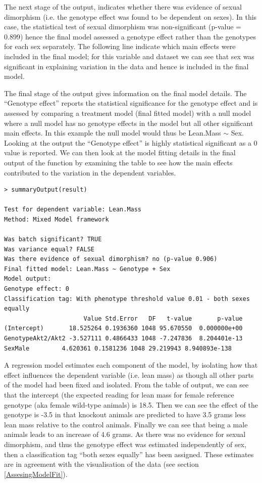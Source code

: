 \documentclass[12pt,a4paper]{article}
\begin{document}
The next stage of the output, indicates whether there was evidence of sexual dimorphism (i.e. the genotype effect was found to be dependent on sexes).  
In this case, the statistical test of sexual dimorphism was non-significant (p-value = 0.899) hence the final model assessed a genotype effect rather than the genotypes for each sex separately.  
The following line indicate which main effects were included in the final model; 
for this variable and dataset we can see that sex was significant in explaining variation in the data and hence is included in the final model. 

The final stage of the output gives information on the final model details.  
The “Genotype effect” reports the statistical significance for the genotype effect and is assessed by comparing a treatment model (final fitted model) with a null model where a null model 
has no genotype effects in the model but all other significant main effects.  
In this example the null model would thus be Lean.Mass $\sim$ Sex. Looking at the output the “Genotype effect” is highly statistical significant as a 0 value is reported.  
We can then look at the model fitting details in the final output of the function by examining the table to see how the main effects contributed to the variation in the dependent variables. 

\begingroup
    \fontsize{8pt}{12pt}\selectfont
\begin{verbatim}
> summaryOutput(result)

Test for dependent variable: Lean.Mass
Method: Mixed Model framework

Was batch significant? TRUE
Was variance equal? FALSE
Was there evidence of sexual dimorphism? no (p-value 0.906)
Final fitted model: Lean.Mass ~ Genotype + Sex
Model output:
Genotype effect: 0
Classification tag: With phenotype threshold value 0.01 - both sexes equally
                      Value Std.Error   DF   t-value       p-value
(Intercept)       18.525264 0.1936360 1048 95.670550  0.000000e+00
GenotypeAkt2/Akt2 -3.527111 0.4866433 1048 -7.247836  8.204401e-13
SexMale         4.620361 0.1581236 1048 29.219943 8.940893e-138

\end{verbatim}
\endgroup 

A regression model estimates each component of the model, by isolating how that effect influences the dependent variable (i.e. lean mass) as though all other parts of the model had been fixed and isolated.   
From the table of output, we can see that the intercept (the expected reading for lean mass for female reference genotype (aka female wild-type animals) is 18.5.  
Then we can see the effect of the genotype is -3.5 in that knockout animals are predicted to have 3.5 grams less lean mass relative to the control animals.  
Finally we can see that being a male animals leads to an increase of 4.6 grams.  
As there was no evidence for sexual dimorphism, and thus the genotype effect was estimated independently of sex, then a classification tag “both sexes equally” has been assigned.  
These estimates are in agreement with the visualisation of the data (see section \ref{AssesingModelFit}). 
\end{document}
